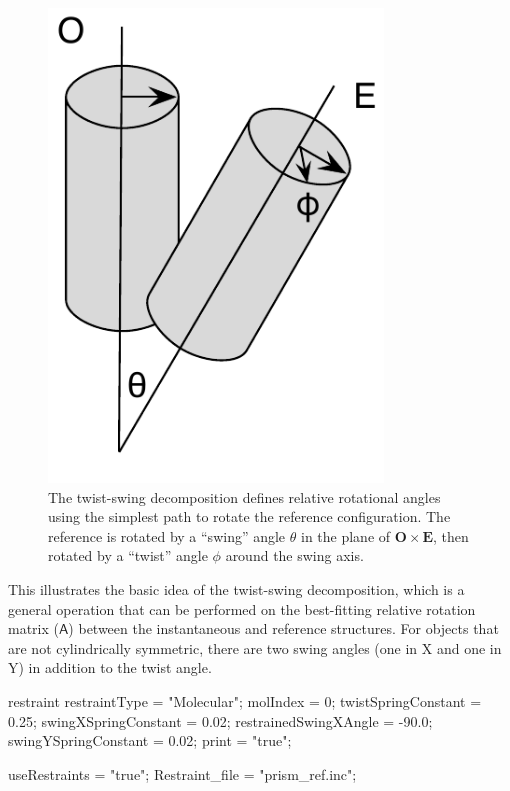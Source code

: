 \documentclass[]{book}
\begin{document}
\begin{figure}
\includegraphics[width=3.5in]{twistSwing}
\caption[The twist-swing decomposition used in orientational
restraints] {The twist-swing decomposition defines relative rotational
  angles using the simplest path to rotate the reference
  configuration.  The reference is rotated by a ``swing'' angle
  $\theta$ in the plane of $\mathbf{O} \times \mathbf{E}$, then
  rotated by a ``twist'' angle $\phi$ around the swing axis.}
\label{fig:twistSwing}
\end{figure}

This illustrates the basic idea of the twist-swing decomposition,
which is a general operation that can be performed on the best-fitting
relative rotation matrix ($\mathsf{A}$) between the instantaneous and
reference structures.  For objects that are not cylindrically
symmetric, there are two swing angles (one in X and one in Y) in
addition to the twist angle.

\begin{code}[caption={[Specifying Restraints for a Molecule] Sample
    keywords defining a molecular restraint and the associated force constants},label={sch:restMol}] 
restraint{
  restraintType = "Molecular";
  molIndex = 0;
  twistSpringConstant = 0.25;
  swingXSpringConstant = 0.02;
  restrainedSwingXAngle = -90.0;
  swingYSpringConstant = 0.02;
  print = "true";
}

useRestraints = "true";
Restraint_file = "prism_ref.inc";
\end{code}
\end{document}
